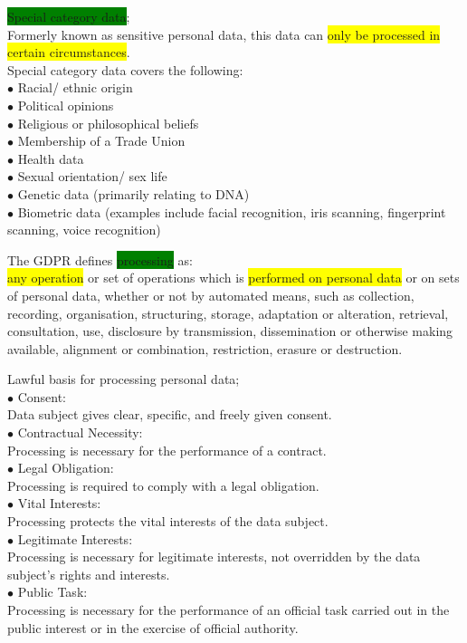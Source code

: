 \documentclass[tikz,border=10pt]{project_plan}
\newcommand{\bulletPoint}{\hspace{-3.1pt}$\bullet$ \hspace{5pt}}
\begin{document}
\colorbox{green}{Special category data};\\
Formerly known as sensitive personal data, this data can \colorbox{yellow}{only be processed in certain circumstances}.\\
Special category data covers the following:\\
\bulletPoint Racial/ ethnic origin\\
\bulletPoint Political opinions\\
\bulletPoint Religious or philosophical beliefs\\
\bulletPoint Membership of a Trade Union\\
\bulletPoint Health data\\
\bulletPoint Sexual orientation/ sex life\\
\bulletPoint Genetic data (primarily relating to DNA)\\
\bulletPoint Biometric data (examples include facial recognition, iris scanning, fingerprint scanning, voice recognition)

The GDPR defines \colorbox{green}{processing} as:\\
\colorbox{yellow}{any operation} or set of operations which is \colorbox{yellow}{performed on personal data} or on
sets of personal data, whether or not by automated means, such as collection,
recording, organisation, structuring, storage, adaptation or alteration,
retrieval, consultation, use, disclosure by transmission, dissemination or
otherwise making available, alignment or combination, restriction, erasure
or destruction.

Lawful basis for processing personal data;\\
\bulletPoint Consent:\\
Data subject gives clear, specific, and freely given consent.\\
\bulletPoint Contractual Necessity:\\
Processing is necessary for the performance of a contract.\\
\bulletPoint Legal Obligation:\\
Processing is required to comply with a legal obligation.\\
\bulletPoint Vital Interests:\\
Processing protects the vital interests of the data subject.\\
\bulletPoint Legitimate Interests:\\
Processing is necessary for legitimate interests, not overridden by the data subject's rights and interests.\\
\bulletPoint Public Task:\\
Processing is necessary for the performance of an official task carried out in the public interest or in the exercise of official authority.
\end{document}

